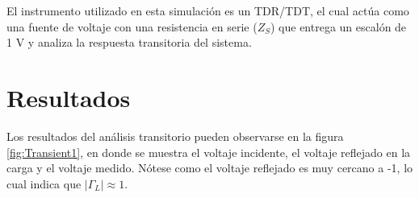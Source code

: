 \documentclass{article}   %
\theoremstyle{mytheoremstyle}
\theoremstyle{mytheoremstyle}
\theoremstyle{myproblemstyle}
\begin{document}
\begin{minipage}{0.49\textwidth}
        El instrumento utilizado en esta simulación es un TDR/TDT, el cual actúa como una fuente de voltaje con una resistencia en
        serie ($Z_{S}$) que entrega un escalón de 1 V y analiza la respuesta transitoria del sistema.

        {\centering\section*{\large Resultados}}
        Los resultados del análisis transitorio pueden observarse en la figura \ref{fig:Transient1}, en donde se muestra el voltaje
        incidente, el voltaje reflejado en la carga y el voltaje medido. Nótese como el voltaje reflejado es muy cercano a -1, lo cual
        indica que $|\Gamma_{L}| \approx 1$.

    \end{minipage}
    \hspace{0.38 cm}
\end{document}
